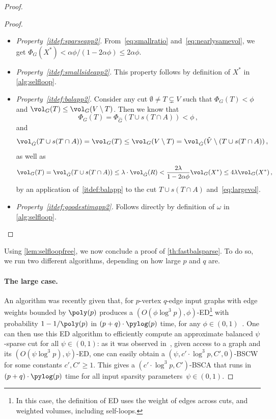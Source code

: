 \begin{proof}
\begin{proof}
\begin{itemize}
	\item \textit{Property~\eqref{itdef:sparseapp2}.} From~\eqref{eq:smallratio} and~\eqref{eq:nearlysamevol}, we get $\Phi_G(X^*) < 	\alpha\phi /({1-2\alpha \phi}) \le 2 \alpha \phi$.
	\item \textit{Property~\eqref{itdef:smallsideapp2}.} This property follows by definition of $X^*$ in \cref{alg:selfloop}.
	\item \textit{Property~\eqref{itdef:balapp2}.} Consider any cut $\emptyset \neq T \subsetneq V$ such that $\Phi_G(T) < \phi$ and $\vol_G(T) \le \vol_G(V \setminus T)$. Then we know that
	\begin{equation*}
		\Phi_G(T) = \Phi_{\hat{G}}(T \cup s(T \cap A)) < \phi \, ,
	\end{equation*}
	and
	\begin{equation*}
		\vol_{\hat{G}}(T \cup s(T \cap A)) = \vol_G(T) \le \vol_G(V \setminus T) = \vol_{\hat{G}}(\hat{V} \setminus (T \cup s(T \cap A))\, ,
	\end{equation*}
	as well as
	\begin{equation*}
		\vol_G(T) = \vol_{\hat{G}}(T \cup s(T \cap A)) \le \lambda \cdot \vol_{\hat{G}}(R) < \frac{2\lambda}{1-2\alpha \phi}\vol_G(X^*) \le 4\lambda \vol_G(X^*)\, ,
	\end{equation*}
	by an application of~\eqref{itdef:balapp} to the cut $T \cup s(T \cap A)$ and~\eqref{eq:largevol}.
	\item \textit{Property~\eqref{itdef:goodestimapp2}.} Follows directly by definition of $\omega$ in \cref{alg:selfloop}.
\end{itemize}
\end{proof}
\noindent
Using \cref{lem:selfloopfree}, we now conclude a proof of \cref{th:fastbalsparse}. To do so, we run two different algorithms, depending on how large $p$ and $q$ are.

\paragraph{The large case.}
An algorithm was recently given that, for $p$-vertex $q$-edge input graphs with edge weights bounded by $\poly(p)$ produces a $(O(\phi \log^3 p), \phi)$-ED\footnote{In this case, the definition of ED uses the weight of edges across cuts, and weighted volumes, including self-loops.} with probability $1-1/\poly(p)$ in $(p+q)\cdot \pylog(p)$ time, for any $\phi \in (0,1)$~\cite{liexpdec}. One can then use this ED algorithm to efficiently compute an approximate balanced $\psi$-sparse cut for all $\psi \in (0,1)$: as it was observed in~\cite{offlineexpdec}, given access to a graph and its $(O(\psi \log^3p), \psi)$-ED, one can easily obtain a $(\psi,c' \cdot \log^3 p, C',0)$-BSCW for some constants $c',C'\ge 1$. This gives a $(c' \cdot \log^3 p, C')$-BSCA that runs in $(p+q)\cdot \pylog(p)$ time for all input sparsity parameters~$\psi \in (0,1)$.


\end{proof}
